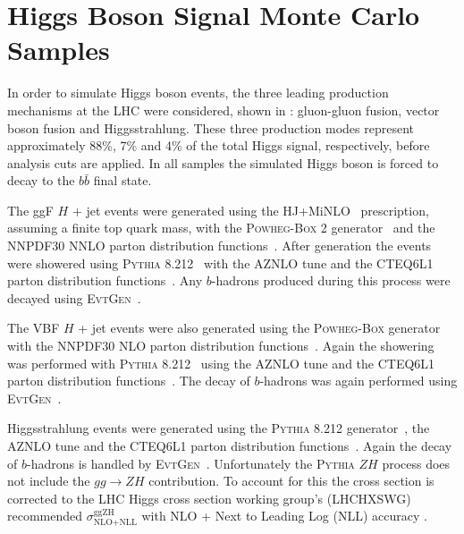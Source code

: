 \section{Higgs Boson Signal Monte Carlo Samples} \label{sec:data:signal_mc}

In order to simulate Higgs boson events, the three leading production
mechanisms at the LHC were considered, shown in :
gluon-gluon fusion, vector boson fusion and Higgsstrahlung.  These three
production modes represent approximately 88\%, 7\% and 4\% of the total Higgs
signal, respectively, before analysis cuts are applied.  In all samples the
simulated Higgs boson is forced to decay to the $b\bar{b}$ final state.

The ggF $H$ + jet events were generated using the HJ+MiNLO~\cite{Hamilton2015}
prescription, assuming a finite top quark mass, with the \textsc{Powheg-Box} 2
generator~\cite{Campbell2012} and the NNPDF30 NNLO parton distribution
functions~\cite{Hamilton:2012rf}.  After generation the events were showered
using \textsc{Pythia} 8.212~\cite{Sjostrand:2014zea} with the AZNLO tune and
the CTEQ6L1 parton distribution functions~\cite{Pumplin:2002vw}. Any
$b$-hadrons produced during this process were decayed using
\textsc{EvtGen}~\cite{LANGE2001152}.

The VBF $H$ + jet events were also generated using the \textsc{Powheg-Box}
generator~\cite{Nason:2009ai} with the NNPDF30 NLO parton distribution
functions~\cite{Hamilton:2012rf}. Again the showering was performed with
\textsc{Pythia} 8.212~\cite{Sjostrand:2014zea} using the AZNLO tune and the
CTEQ6L1 parton distribution functions~\cite{Pumplin:2002vw}.  The decay of
$b$-hadrons was again performed using \textsc{EvtGen}~\cite{LANGE2001152}.

Higgsstrahlung events were generated using the \textsc{Pythia} 8.212
generator~\cite{Sjostrand:2014zea}, the AZNLO tune and the CTEQ6L1 parton
distribution functions~\cite{Pumplin:2002vw}.  Again the decay of $b$-hadrons
is handled by \textsc{EvtGen}~\cite{LANGE2001152}. Unfortunately the
\textsc{Pythia} $ZH$ process does not include the $gg \rightarrow ZH$
contribution.  To account for this the cross section is corrected to the LHC
Higgs cross section working group's (LHCHXSWG) recommended
$\sigma_{\text{NLO+NLL}}^{\text{ggZH}}$ with NLO + Next to Leading Log (NLL)
accuracy \cite{MelladoGarcia:2150771}.
